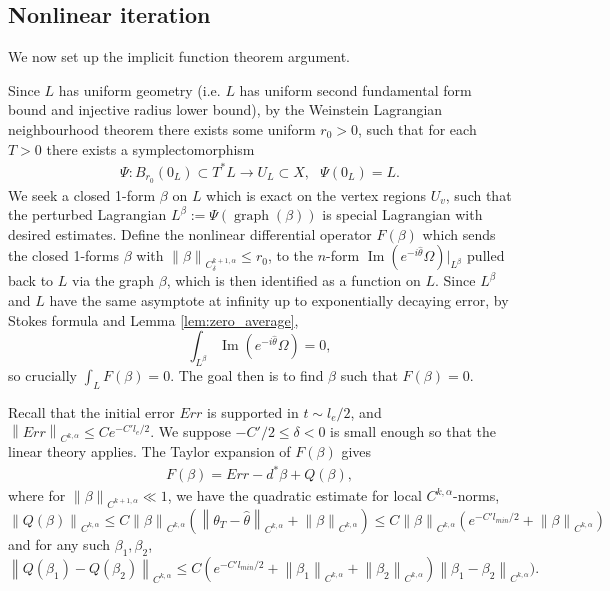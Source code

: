 \documentclass{article}
\theoremstyle{definition}
\newcommand{\norm}[1]{\left\lVert#1\right\rVert}
\begin{document}
	
	\subsection{Nonlinear iteration}
	
	We now set up the implicit function theorem argument.
	
	
	Since $L$ has uniform geometry (i.e. $L$ has
	uniform second fundamental form bound and injective radius lower
	bound), by the Weinstein Lagrangian neighbourhood theorem there exists some uniform $r_0 > 0$,
such that for each $T > 0$ there exists a
	symplectomorphism
	\begin{align*}
		\Psi: B_{r_0}(0_{L}) \subset T^*L \longrightarrow U_L \subset X, \:\:\: \Psi(0_{L}) = L.
	\end{align*}
	We seek a closed 1-form $\beta$ on $L$ which is exact on the vertex regions $U_v$, such that the perturbed Lagrangian
	$
	L^\beta := \Psi(\operatorname{graph}(\beta))
	$
	is special Lagrangian with desired estimates.
	Define the nonlinear differential operator $F(\beta)$ which sends the closed 1-forms $\beta$ with $\norm{\beta}_{C^{k+1,\alpha}_\delta}\leq r_0$, to the $n$-form $\operatorname{Im}(e^{-i\hat\theta}\Omega)|_{L^\beta}$ pulled back to $L$ via the graph $\beta$, which is then identified as a function on $L$.
	Since $L^\beta$ and $L$ have the same asymptote at infinity up to exponentially decaying error, by Stokes formula and Lemma \ref{lem:zero_average},
	\begin{equation}\label{eqn:integralzero}
		\int_{L^\beta} \operatorname{Im}(e^{-i\hat\theta}\Omega) =0,
	\end{equation}
	so crucially $\int_{L} F(\beta)=0 $.
	The goal then is to find $\beta$ such that $F(\beta) = 0$.
	
	
	
	
	
	
	
	Recall that the initial error $Err$ is supported in $t\sim l_e/2$, and $\norm{Err}_{C^{k,\alpha}} \leq C e^{-C'l_e/2}$. 
	We suppose $-C'/2\leq  \delta<0$ is small enough so that the linear theory applies. 
	The Taylor expansion of $F(\beta)$ gives
	\begin{align*}
		F(\beta) =  Err - d^* \beta +  Q(\beta),
	\end{align*}
	where for $\norm{\beta}_{C^{k+1,\alpha} }\ll 1$, we have the quadratic estimate for local $C^{k,\alpha}$-norms,
	\[
	\norm{Q(\beta)}_{ C^{k,\alpha} } \leq C\norm{\beta}_{C^{k,\alpha} }(\norm{\theta_T-\hat{\theta} }_{C^{k,\alpha}}+ \norm{\beta}_{C^{k,\alpha}}) \leq C\norm{\beta}_{C^{k,\alpha} }(  e^{-C' l_{min}/2} + \norm{\beta}_{C^{k,\alpha}}) 
	\]
	and for any such $\beta_1, \beta_2$, 
	\[
	\norm{Q(\beta_1)- Q(\beta_2) }_{ C^{k,\alpha}} \leq C (  e^{-C' l_{min}/2}  +\norm{ \beta_1 }_{C^{k,\alpha} }+ \norm{\beta_2}_{C^{k,\alpha} }) \norm{\beta_1-\beta_2}_{ C^{k,\alpha} }).
	\]
	
\end{document}
